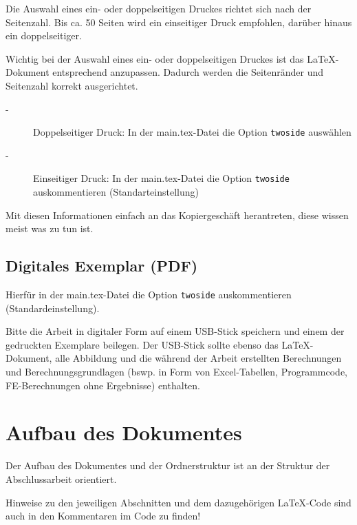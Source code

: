 Die Auswahl eines ein- oder doppelseitigen Druckes richtet sich nach der Seitenzahl. Bis ca. 50 Seiten wird ein einseitiger Druck empfohlen, darüber hinaus ein doppelseitiger.

Wichtig bei der Auswahl eines ein- oder doppelseitigen Druckes ist das LaTeX-Dokument entsprechend anzupassen. Dadurch werden die Seitenränder und Seitenzahl korrekt ausgerichtet.

\begin{description}
	\item[-] Doppelseitiger Druck: In der main.tex-Datei die Option \lstinline[basicstyle=\ttfamily]|twoside| auswählen
	\item[-] Einseitiger Druck: In der main.tex-Datei die Option \lstinline[basicstyle=\ttfamily]|twoside| auskommentieren (Standarteinstellung)
\end{description}

Mit diesen Informationen einfach an das Kopiergeschäft herantreten, diese wissen meist was zu tun ist.

\subsection*{Digitales Exemplar (PDF)}

Hierfür in der main.tex-Datei die Option \lstinline[basicstyle=\ttfamily]|twoside| auskommentieren (Standardeinstellung).

Bitte die Arbeit in digitaler Form auf einem USB-Stick speichern und einem der gedruckten Exemplare beilegen. Der USB-Stick sollte ebenso das LaTeX-Dokument, alle Abbildung und die während der Arbeit erstellten Berechnungen und Berechnungsgrundlagen (bswp. in Form von Excel-Tabellen, Programmcode, FE-Berechnungen ohne Ergebnisse) enthalten.

\newpage

\section*{Aufbau des Dokumentes}

Der Aufbau des Dokumentes und der Ordnerstruktur ist an der Struktur der Abschlussarbeit orientiert. 

Hinweise zu den jeweiligen Abschnitten und dem dazugehörigen LaTeX-Code sind auch in den Kommentaren im Code zu finden!\\ 
\\


